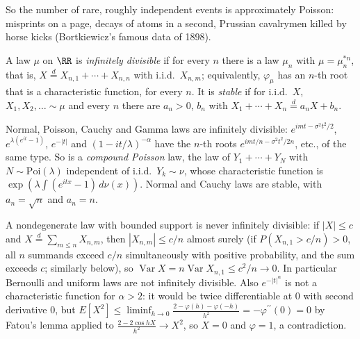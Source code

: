 So the number of rare, roughly independent events is approximately Poisson: misprints on a page, decays of atoms in a second, Prussian cavalrymen killed by horse kicks (Bortkiewicz's famous data of 1898).

\begin{definition}\label{probability:definition-infinitely-divisible}
A law $\mu$ on $\RR$ is \emph{infinitely divisible} if for every $n$ there is a law $\mu_n$ with $\mu = \mu_n^{*n}$, that is, $X \overset{d}{=} X_{n,1} + \cdots + X_{n,n}$ with i.i.d.\ $X_{n,m}$; equivalently, $\varphi_\mu$ has an $n$-th root
that is a characteristic function, for every $n$. It is \emph{stable} if for i.i.d.\ $X$, $X_1, X_2, \ldots \sim \mu$ and every $n$ there are $a_n > 0$, $b_n$ with $X_1 + \cdots + X_n \overset{d}{=} a_nX + b_n$.
\end{definition}

\begin{example}\label{probability:example-infinitely-divisible}
Normal, Poisson, Cauchy and Gamma laws are infinitely divisible: $e^{imt - \sigma^2t^2/2}$, $e^{\lambda(e^{it} - 1)}$, $e^{-|t|}$ and $(1 - it/\lambda)^{-\alpha}$ have the $n$-th roots $e^{imt/n - \sigma^2t^2/2n}$, etc., of the same type. So is a
\emph{compound Poisson} law, the law of $Y_1 + \cdots + Y_N$ with $N \sim \mathrm{Poi}(\lambda)$ independent of i.i.d.\ $Y_k \sim \nu$, whose characteristic function is $\exp(\lambda\int(e^{itx} - 1)\,d\nu(x))$. Normal and Cauchy laws are
stable, with $a_n = \sqrt n$ and $a_n = n$.
\end{example}

\begin{counterexample}\label{probability:counterexample-not-infinitely-divisible}
A nondegenerate law with bounded support is never infinitely divisible: if $|X| \leq c$ and $X \overset{d}{=} \sum_{m \leq n}X_{n,m}$, then $|X_{n,m}| \leq c/n$ almost surely (if $P(X_{n,1} > c/n) > 0$, all $n$ summands exceed $c/n$ simultaneously with positive probability, and the sum exceeds $c$; similarly below), so
$\operatorname{Var}X = n\operatorname{Var}X_{n,1} \leq c^2/n \to 0$. In particular Bernoulli and uniform laws are not infinitely divisible. Also $e^{-|t|^\alpha}$ is not a characteristic function for $\alpha > 2$: it would be twice
differentiable at $0$ with second derivative $0$, but $E[X^2] \leq \liminf_{h \to 0}\frac{2 - \varphi(h) - \varphi(-h)}{h^2} = -\varphi^{\prime\prime}(0) = 0$ by Fatou's lemma applied to $\frac{2 - 2\cos hX}{h^2} \to X^2$, so $X = 0$ and
$\varphi = 1$, a contradiction.
\end{counterexample}

